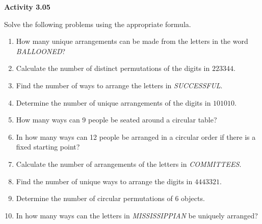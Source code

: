 \vspace{0.3ex}
\noindent\textbf{Activity 3.05}

\vspace{0.2ex}

Solve the following problems using the appropriate formula.

\begin{enumerate}[label=\color{blue}\arabic*.]
    \item How many unique arrangements can be made from the letters in the word \textit{BALLOONED}?
    \item Calculate the number of distinct permutations of the digits in \(223344\).
    \item Find the number of ways to arrange the letters in \textit{SUCCESSFUL}.
    \item Determine the number of unique arrangements of the digits in \(101010\).
    \item How many ways can 9 people be seated around a circular table?
    \item In how many ways can 12 people be arranged in a circular order if there is a fixed starting point?
    \item Calculate the number of arrangements of the letters in \textit{COMMITTEES}.
    \item Find the number of unique ways to arrange the digits in \(4443321\).
    \item Determine the number of circular permutations of 6 objects.
    \item In how many ways can the letters in \textit{MISSISSIPPIAN} be uniquely arranged?
\end{enumerate}

